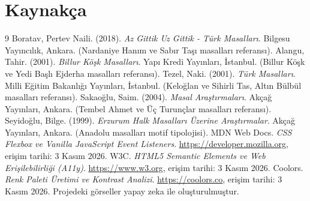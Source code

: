 \documentclass[12pt,a4paper]{article}
\begin{document}
\section{Kaynakça}
\begin{thebibliography}{9}
 Boratav, Pertev Naili. (2018). \emph{Az Gittik Uz Gittik - Türk Masalları}. Bilgesu Yayıncılık, Ankara. (Nardaniye Hanım ve Sabır Taşı masalları referansı).
 Alangu, Tahir. (2001). \emph{Billur Köşk Masalları}. Yapı Kredi Yayınları, İstanbul. (Billur Köşk ve Yedi Başlı Ejderha masalları referansı).
 Tezel, Naki. (2001). \emph{Türk Masalları}. Milli Eğitim Bakanlığı Yayınları, İstanbul. (Keloğlan ve Sihirli Tas, Altın Bülbül masalları referansı).
 Sakaoğlu, Saim. (2004). \emph{Masal Araştırmaları}. Akçağ Yayınları, Ankara. (Tembel Ahmet ve Üç Turunçlar masalları referansı).
 Seyidoğlu, Bilge. (1999). \emph{Erzurum Halk Masalları Üzerine Araştırmalar}. Akçağ Yayınları, Ankara. (Anadolu masalları motif tipolojisi).
 MDN Web Docs. \emph{CSS Flexbox ve Vanilla JavaScript Event Listeners}. \url{https://developer.mozilla.org}, erişim tarihi: 3 Kasım 2026.
 W3C. \emph{HTML5 Semantic Elements ve Web Erişilebilirliği (A11y)}. \url{https://www.w3.org}, erişim tarihi: 3 Kasım 2026.
 Coolors. \emph{Renk Paleti Üretimi ve Kontrast Analizi}. \url{https://coolors.co}, erişim tarihi: 3 Kasım 2026.
 Projedeki görseller yapay zeka ile oluşturulmuştur.
\end{thebibliography}

\appendix
\end{document}
